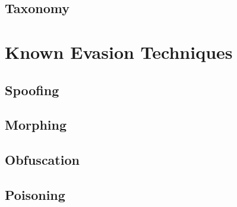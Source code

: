 \documentclass[11pt,fleqn,oneside]{book} %
\begin{document}
\chapter{Taxonomy} \label{ch:taxonomy}




\part{Known Evasion Techniques}
\chapter{Spoofing} \label{ch:known-spoofing}


\newpage
\newpage
\chapter{Morphing} \label{ch:known-morphing}



\chapter{Obfuscation} \label{ch:known-obfuscation}


\newpage
\newpage
\chapter{Poisoning} \label{ch:known-poisoning}


\end{document}
